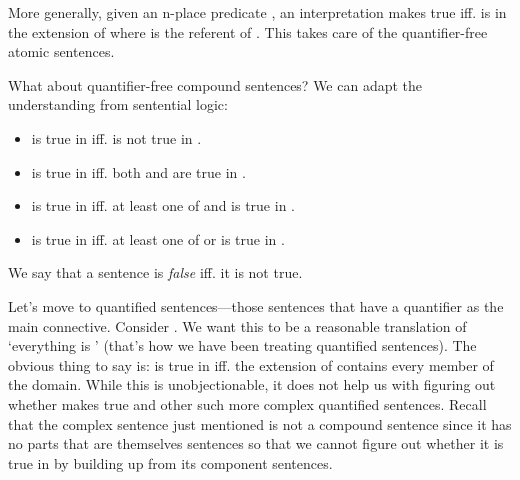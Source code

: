 More generally, given an n-place predicate , an interpretation 
 makes true  iff.  
 is in the extension of  
where  is the referent of \p{\chi}.
This takes care of the quantifier-free atomic sentences.

What about quantifier-free compound sentences? We can adapt the understanding 
from sentential logic:
\begin{itemize}

 \item {} is true in   iff.   is not true in 
  \model.

 \item  {} is true in \model{}  iff.  both  and  
  are true in \model.

 \item {} is true in \model{}  iff.  at least one of  and 
   is true in \model.

\item  {} is true in \model{} iff.   at least one of  or  is true in \model.

\end{itemize}

We say that a sentence is \emph{false} iff. it is not true.

Let's move to quantified sentences---those sentences that have a quantifier as 
the main connective. Consider . We want this to be a reasonable 
translation of `everything is ' (that's how we have been treating 
quantified sentences). The obvious thing to say is:  is true in \model{}  iff. the extension of  contains 
every member of the domain. While this is unobjectionable, it does not help us 
with figuring out whether  makes true  and other such more complex 
quantified sentences.  Recall that the complex sentence just mentioned is not a 
compound sentence since it has no parts that are themselves sentences so that we 
cannot figure out whether it is true in \model{} by building up from its 
component sentences.


\newcommand{\llqex}{\p{\mathcal L_Q^+}}

